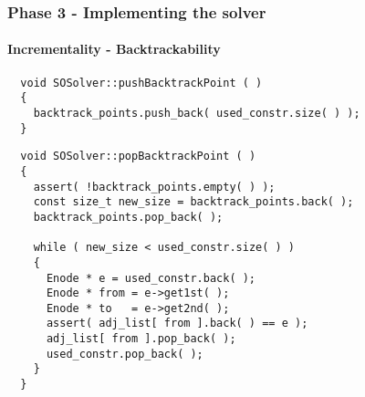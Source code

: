 \begin{frame}[fragile]
  \frametitle{Phase 3 - Implementing the solver}
  \framesubtitle{Incrementality - Backtrackability}

  \scriptsize

  \begin{verbatim}
  void SOSolver::pushBacktrackPoint ( )
  {
    backtrack_points.push_back( used_constr.size( ) );
  }
  \end{verbatim}

  \begin{verbatim}
  void SOSolver::popBacktrackPoint ( )
  {
    assert( !backtrack_points.empty( ) );
    const size_t new_size = backtrack_points.back( );
    backtrack_points.pop_back( );
    
    while ( new_size < used_constr.size( ) )
    {
      Enode * e = used_constr.back( );
      Enode * from = e->get1st( );
      Enode * to   = e->get2nd( );
      assert( adj_list[ from ].back( ) == e );
      adj_list[ from ].pop_back( );
      used_constr.pop_back( );
    }
  }
  \end{verbatim}

\end{frame}

